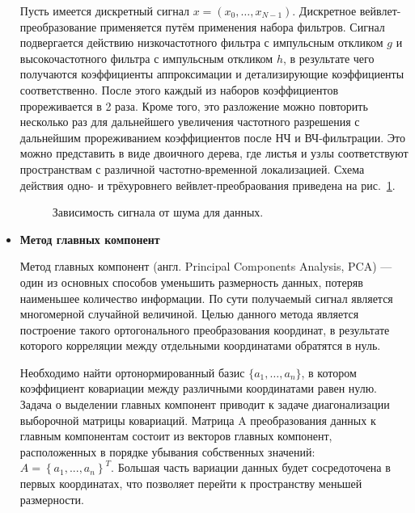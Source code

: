 \documentclass[12pt,fleqn]{article}
\begin{document}
\begin{itemize}
	\par Пусть имеется дискретный сигнал $x = (x_0, \dots, x_{N-1})$. Дискретное вейвлет-преобразование применяется путём применения набора фильтров. Сигнал подвергается действию низкочастотного фильтра с импульсным откликом $g$ и высокочастотного фильтра с импульсным откликом $h$, в результате чего получаются коэффициенты аппроксимации и детализирующие коэффициенты соответственно. После этого каждый из наборов коэффициентов прореживается в 2 раза. Кроме того, это разложение можно повторить несколько раз для дальнейшего увеличения частотного разрешения с дальнейшим прореживанием коэффициентов после НЧ и ВЧ-фильтрации. Это можно представить в виде двоичного дерева, где листья и узлы соответствуют пространствам с различной частотно-временной локализацией. Схема действия одно- и трёхуровнего вейвлет-преобраования приведена на рис.~\ref{wavelet_scheme}.

\begin{figure}[H]
\begin{minipage}[H]{1.0\linewidth}
\end{minipage}
\begin{minipage}[H]{1.0\linewidth}
\end{minipage}
\caption{Зависимость сигнала от шума для данных.}
\label{wavelet_scheme}
\end{figure}
	\item
	{\bf Метод главных компонент}
	\par Метод главных компонент (англ. Principal Components Analysis, PCA) — один из основных способов уменьшить размерность данных, потеряв наименьшее количество информации. По сути получаемый сигнал является многомерной случайной величиной. Целью данного метода является построение такого ортогонального преобразования координат, в результате которого корреляции между отдельными координатами обратятся в нуль. 	
	\par Необходимо найти ортонормированный базис $\{a_1, \dots, a_n \}$, в котором коэффициент ковариации между различными координатами равен нулю. Задача о выделении главных компонент приводит к задаче диагонализации выборочной матрицы ковариаций. Матрица A преобразования данных к главным компонентам состоит из векторов главных компонент, расположенных в порядке убывания собственных значений:
$A=\left \{a_1,...,a_n \right \}^T.$ Большая часть вариации данных будет сосредоточена в первых координатах, что позволяет перейти к пространству меньшей размерности.


\end{itemize}
\end{document}
